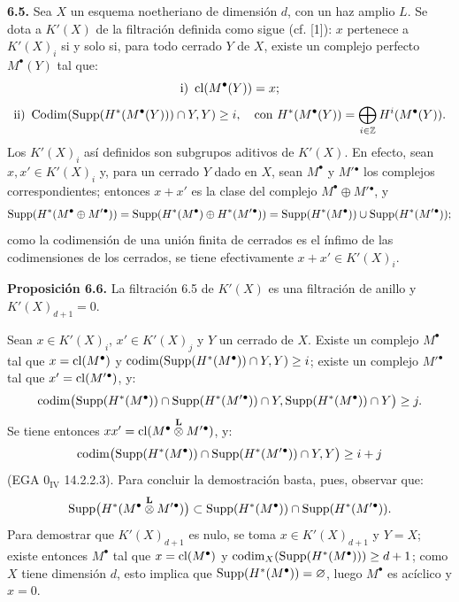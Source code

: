 \providecommand{\sisi}[2]{#2}

\textbf{6.5.} Sea $X$ un esquema noetheriano de dimensión $d$, con un haz amplio $L$. Se dota a $K'(X)$ de la filtración definida como sigue (cf. [1]): $x$ pertenece a $K'(X)_i$ si y solo si, para todo cerrado $Y$ de $X$, existe un complejo perfecto $M^\bullet(Y)$ tal que:
\[
  \text{i) } \operatorname{cl}(M^\bullet(Y))=x;
\]
\[
  \text{ii) } \operatorname{Codim}(\Supp(H^*(M^\bullet(Y)))\cap Y,Y)\ge i,
  \quad\text{con } H^*(M^\bullet(Y))=\bigoplus_{\sisi{i\ge0}{i\in\mathbb Z}}H^i(M^\bullet(Y)).
\]
Los $K'(X)_i$ así definidos son subgrupos aditivos de $K'(X)$. En efecto, sean $x,x'\in K'(X)_i$ y, para un cerrado $Y$ dado en $X$, sean $M^\bullet$ y $M'{}^\bullet$ los complejos correspondientes; entonces $x+x'$ es la clase del complejo $M^\bullet\oplus M'{}^\bullet$, y
\[
\operatorname{Supp}(H^*(M^\bullet\oplus M'{}^\bullet))
 =\operatorname{Supp}(H^*(M^\bullet)\oplus H^*(M'{}^\bullet))
 =\operatorname{Supp}(H^*(M^\bullet))\cup\operatorname{Supp}(H^*(M'{}^\bullet));
\]
como la codimensión de una unión finita de cerrados es el ínfimo de las codimensiones de los cerrados, se tiene efectivamente $x+x'\in K'(X)_i$.

\textbf{Proposición 6.6.} La filtración \sisi{5.5}{6.5} de $K'(X)$ es una filtración de anillo y $K'(X)_{d+1}=0$.

Sean $x\in K'(X)_i$, $x'\in K'(X)_j$ y $Y$ un cerrado de $X$. Existe un complejo $M^\bullet$ tal que $x=\operatorname{cl}(M^\bullet)$ y $\operatorname{codim}(\operatorname{Supp}(H^*(M^\bullet))\cap Y,Y)\ge i$; existe un complejo $M'{}^\bullet$ tal que $x'=\operatorname{cl}(M'{}^\bullet)$, y:
\[
\operatorname{codim}\bigl(\operatorname{Supp}(H^*(M^\bullet))\cap\operatorname{Supp}(H^*(M'{}^\bullet))\cap Y,
            \operatorname{Supp}(H^*(M^\bullet))\cap Y\bigr)\ge j.
\]
Se tiene entonces $xx'=\operatorname{cl}(M^\bullet\overset{\mathbf L}{\otimes}M'{}^\bullet)$, y:
\[
\operatorname{codim}\bigl(\operatorname{Supp}(H^*(M^\bullet))\cap\operatorname{Supp}(H^*(M'{}^\bullet))\cap Y,Y\bigr)\ge i+j
\]
(EGA $0_{\mathrm{IV}}$ 14.2.2.3). Para concluir la demostración basta, pues, observar que:
\[
\operatorname{Supp}\bigl(H^*(M^\bullet\overset{\mathbf L}{\otimes}M'{}^\bullet)\bigr)
 \subset \operatorname{Supp}(H^*(M^\bullet))\cap\operatorname{Supp}(H^*(M'{}^\bullet)).
\]
Para demostrar que $K'(X)_{d+1}$ es nulo, se toma $x\in K'(X)_{d+1}$ y $Y=X$; existe entonces $M^\bullet$ tal que $x=\operatorname{cl}(M^\bullet)$ y $\operatorname{codim}_X(\operatorname{Supp}(H^*(M^\bullet)))\ge d+1$; como $X$ tiene dimensión $d$, esto implica que $\operatorname{Supp}(H^*(M^\bullet))=\varnothing$, luego $M^\bullet$ es acíclico y $x=0$.

